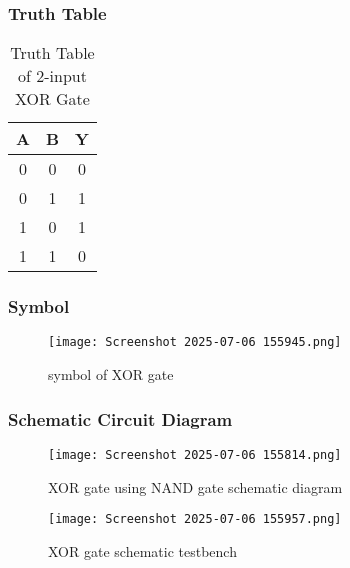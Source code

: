 \documentclass[12pt]{article}
\begin{document}
    \subsubsection{Truth Table}
        \begin{table}[H]
        \centering
        \caption{Truth Table of 2-input XOR Gate}
        \begin{tabular}{|c|c|c|}
        \hline
        \textbf{A} & \textbf{B} & \textbf{Y} \\
        \hline
        0 & 0 & 0 \\
        0 & 1 & 1 \\
        1 & 0 & 1 \\
        1 & 1 & 0 \\
        \hline
        \end{tabular}
        \end{table}

    \subsubsection{Symbol}
        \begin{figure}[H]
            \centering
            \texttt{[image: Screenshot 2025-07-06 155945.png]}
            \caption{symbol of XOR gate}
            \label{fig:enter-label}
        \end{figure}
    \subsubsection{Schematic Circuit Diagram}

       \begin{figure}[H]
           \centering
           \texttt{[image: Screenshot 2025-07-06 155814.png]}
           \caption{XOR gate using NAND gate schematic diagram}
           \label{fig:enter-label}
       \end{figure}

       \begin{figure}[H]
           \centering
           \texttt{[image: Screenshot 2025-07-06 155957.png]}
           \caption{XOR gate schematic testbench}
           \label{fig:enter-label}
       \end{figure}
\end{document}
